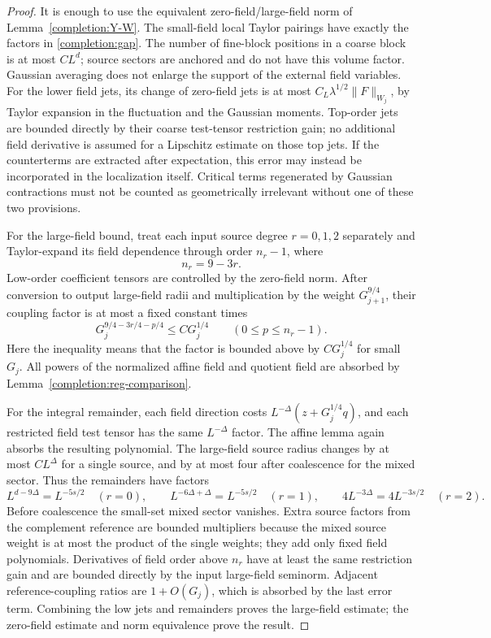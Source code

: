 \documentclass[11pt]{article}
\begin{document}
\begin{proof}
It is enough to use the equivalent zero-field/large-field norm of
Lemma~\ref{completion:Y-W}. The small-field local Taylor pairings have
exactly the factors in \eqref{completion:gap}. The number of fine-block
positions in a coarse block is at most \(CL^d\); source sectors are
anchored and do not have this volume factor. Gaussian averaging does
not enlarge the support of the external field variables. For the lower field jets, its change of zero-field jets is at most
\(C_L\lambda^{1/2}\|F\|_{W_j}\), by Taylor expansion in the fluctuation
and the Gaussian moments. Top-order jets are bounded directly by their
coarse test-tensor restriction gain; no additional field derivative is
assumed for a Lipschitz estimate on those top jets. If the
counterterms are extracted after expectation, this error may instead
be incorporated in the localization itself. Critical terms regenerated
by Gaussian contractions must not be counted as geometrically irrelevant
without one of these two provisions.

For the large-field bound, treat each input source degree
\(r=0,1,2\) separately and Taylor-expand its field dependence through
order \(n_r-1\), where
\[
 n_r=9-3r.
\]
Low-order coefficient tensors are controlled by the zero-field norm.
After conversion to output large-field radii and multiplication by the
weight \(G_{j+1}^{9/4}\), their coupling factor is at most a fixed
constant times
\[
 G_j^{9/4-3r/4-p/4}\le C G_j^{1/4}
        \qquad(0\le p\le n_r-1).
\]
Here the inequality means that the factor is bounded above by
\(CG_j^{1/4}\) for small \(G_j\). All powers of the normalized affine
field and quotient field are absorbed by Lemma~\ref{completion:reg-comparison}.

For the integral remainder, each field direction costs
\(L^{-\Delta}(z+G_j^{1/4}q)\), and each restricted field test tensor
has the same \(L^{-\Delta}\) factor. The affine lemma again absorbs
the resulting polynomial. The large-field source radius changes by at
most \(CL^\Delta\) for a single source, and by at most four after
coalescence for the mixed sector. Thus the remainders have factors
\[
 L^{d-9\Delta}=L^{-5s/2}\quad(r=0),\qquad
 L^{-6\Delta+\Delta}=L^{-5s/2}\quad(r=1),\qquad
 4L^{-3\Delta}=4L^{-3s/2}\quad(r=2).
\]
Before coalescence the small-set mixed sector vanishes. Extra source
factors from the complement reference are bounded multipliers because
the mixed source weight is at most the product of the single weights;
they add only fixed field polynomials. Derivatives of field order above
\(n_r\) have at least the same restriction gain and are bounded directly
by the input large-field seminorm. Adjacent reference-coupling ratios
are \(1+O(G_j)\), which is absorbed by the last error term.
Combining the low jets and remainders proves the large-field estimate;
the zero-field estimate and norm equivalence prove the result.
\end{proof}
\end{document}
